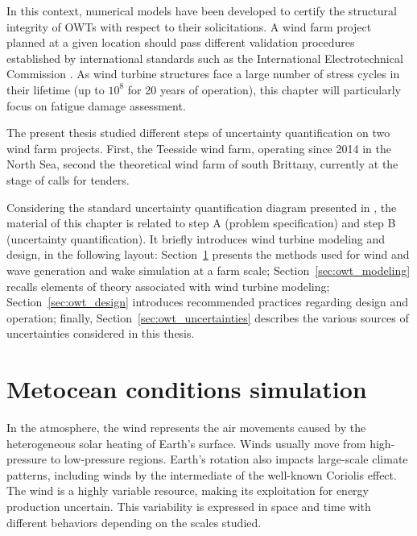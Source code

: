 In this context, numerical models have been developed to certify the structural integrity of OWTs with respect to their solicitations. 
A wind farm project planned at a given location should pass different validation procedures established by international standards such as the International Electrotechnical Commission \citep{iec_2019}. 
As wind turbine structures face a large number of stress cycles in their lifetime (up to $10^8$ for 20 years of operation), this chapter will particularly focus on fatigue damage assessment.

The present thesis studied different steps of uncertainty quantification on two wind farm projects. 
First, the Teesside wind farm, operating since 2014 in the North Sea, second the theoretical wind farm of south Brittany, currently at the stage of calls for tenders.

Considering the standard uncertainty quantification diagram presented in , the material of this chapter is related to step A (problem specification) and step B (uncertainty quantification). 
It briefly introduces wind turbine modeling and design, in the following layout: 
Section~\ref{sec:metocean_simulation} presents the methods used for wind and wave generation and wake simulation at a farm scale; 
Section~\ref{sec:owt_modeling} recalls elements of theory associated with wind turbine modeling; 
Section~\ref{sec:owt_design} introduces recommended practices regarding design and operation; 
finally, Section~\ref{sec:owt_uncertainties} describes the various sources of uncertainties considered in this thesis. 



\section{Metocean conditions simulation} \label{sec:metocean_simulation}

In the atmosphere, the wind represents the air movements caused by the heterogeneous solar heating of Earth's surface. 
Winds usually move from high-pressure to low-pressure regions. 
Earth's rotation also impacts large-scale climate patterns, including winds by the intermediate of the well-known Coriolis effect. 
The wind is a highly variable resource, making its exploitation for energy production uncertain. 
This variability is expressed in space and time with different behaviors depending on the scales studied. 

